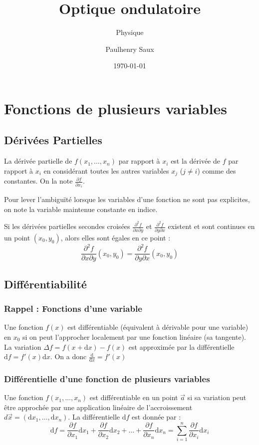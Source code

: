 \documentclass[french]{yLectureNote}
\title{Optique ondulatoire}
\subtitle{Physique}
\author{Paulhenry Saux}
\date{\today}
\renewcommand{\vec}{\overrightarrow}
\newcommand{\dd}{\mathrm{d}}
\begin{document}
\chapter{Fonctions de plusieurs variables}

\section{Dérivées Partielles}

\begin{definition}
La dérivée partielle de $f(x_1, \dots, x_n)$ par rapport à $x_i$ est la dérivée de $f$ par rapport à $x_i$ en considérant toutes les autres variables $x_j$ ($j \neq i$) comme des constantes. On la note $\frac{\partial f}{\partial x_i}$.
\end{definition}

Pour lever l'ambiguïté lorsque les variables d'une fonction ne sont pas explicites, on note la variable maintenue constante en indice.

\begin{theorem}[Schwarz]
Si les dérivées partielles secondes croisées $\frac{\partial^2 f}{\partial x \partial y}$ et $\frac{\partial^2 f}{\partial y \partial x}$ existent et sont continues en un point $(x_0, y_0)$, alors elles sont égales en ce point :
\[ \frac{\partial^2 f}{\partial x \partial y}(x_0, y_0) = \frac{\partial^2 f}{\partial y \partial x}(x_0, y_0) \]
\end{theorem}

\section{Différentiabilité}

\subsection{Rappel : Fonctions d'une variable}
Une fonction $f(x)$ est différentiable (équivalent à dérivable pour une variable) en $x_0$ si on peut l'approcher localement par une fonction linéaire (sa tangente). La variation $\Delta f = f(x+\dd x) - f(x)$ est approximée par la différentielle $\dd f = f'(x)\dd x$. On a donc \(\frac{\dd}{\dd x} = f'(x)\)

\subsection{Différentielle d'une fonction de plusieurs variables}
\begin{definition}
Une fonction $f(x_1, \dots, x_n)$ est différentiable en un point $\vec{a}$ si sa variation peut être approchée par une application linéaire de l'accroissement $d\vec{x} = (\dd x_1, \dots, \dd x_n)$. La différentielle $\dd f$ est donnée par :
\[ \dd f = \frac{\partial f}{\partial x_1}\dd x_1 + \frac{\partial f}{\partial x_2}\dd x_2 + \dots + \frac{\partial f}{\partial x_n}\dd x_n = \sum_{i=1}^{n} \frac{\partial f}{\partial x_i}\dd x_i \]
\end{definition}
\end{document}
